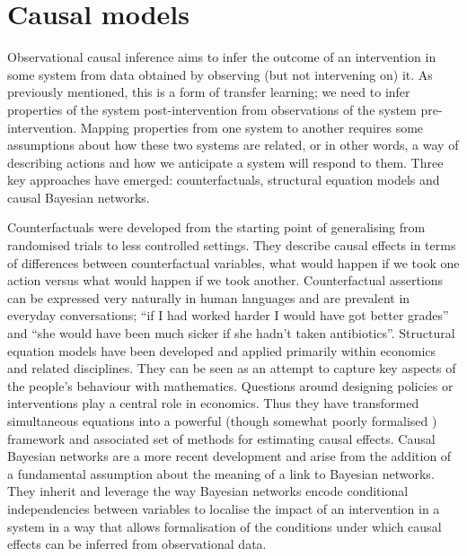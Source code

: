 \documentclass[11pt,a4paper,twoside]{report}
\newcommand{\quotes}[1]{``#1''}
\theoremstyle{plain}
\theoremstyle{definition}
\begin{document}
\section{Causal models}
\label{sec:causal_models}

Observational causal inference aims to infer the outcome of an intervention in some system from data obtained by observing (but not intervening on) it. As previously mentioned, this is a form of transfer learning; we need to infer properties of the system post-intervention from observations of the system pre-intervention. Mapping properties from one system to another requires some assumptions about how these two systems are related, or in other words, a way of describing actions and how we anticipate a system will respond to them. Three key approaches have emerged: counterfactuals, structural equation models and causal Bayesian networks. 

Counterfactuals \citep{Rubin1974} were developed from the starting point of generalising from randomised trials to less controlled settings. They describe causal effects in terms of differences between counterfactual variables, what would happen if we took one action versus what would happen if we took another. Counterfactual assertions can be expressed very naturally in human languages and are  prevalent in  everyday conversations; \quotes{if I had worked harder I would have got better grades} and \quotes{she would have been much sicker if she hadn't taken antibiotics}. Structural equation models have been developed and applied primarily within economics and related disciplines. They can be seen as an attempt to capture key aspects of the people's behaviour with mathematics. Questions around designing policies or interventions play a central role in economics. Thus they have transformed simultaneous equations into a powerful (though somewhat poorly formalised \citep{Pearl2000}) framework and associated set of methods for estimating causal effects. Causal Bayesian networks \citep{Pearl2000} are a more recent development and arise from the addition of a fundamental assumption about the meaning of a link to Bayesian networks. They inherit and leverage the way Bayesian networks encode conditional independencies between variables to localise the impact of an intervention in a system in a way that allows formalisation of the conditions under which causal effects can be inferred from observational data. 
\end{document}
